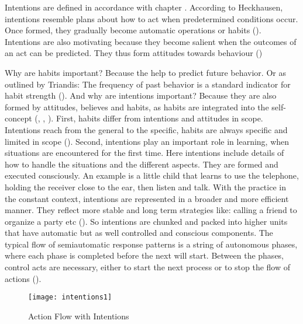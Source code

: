 Intentions are defined in accordance with chapter \label{knowledge and task}. According to Heckhausen, intentions resemble plans about how to act when predetermined conditions occur. Once formed, they gradually become automatic operations or habits (\cite{heckhausen1990intentional}). Intentions are also motivating because they become salient when the outcomes of an act can be predicted. They thus form attitudes towards behaviour (\cite{ouellette1998habit})

Why are habits important? Because the help to predict future behavior. Or as outlined by Triandis: The frequency of past behavior is a standard indicator for habit strength (\cite{triandis1979values}). And why are intentions important? Because they are also formed by attitudes, believes and habits, as habits are integrated into the self-concept (\cite{ouellette1998habit}, \cite{festinger1962theory}, \cite{bem1973self}). First, habits differ from intentions and attitudes in scope. Intentions reach from the general to the specific, habits are always specific and limited in scope (\cite{allport1935attitudes}). Second, intentions play an important role in learning, when situations are encountered for the first time. Here intentions include details of how to handle the situations and the different aspects. They are formed and executed consciously. An example is a little child that learns to use the telephone, holding the receiver close to the ear, then listen and talk. With the practice in the constant context, intentions are represented in a broader and more efficient manner. They reflect more stable and long term strategies like: calling a friend to organize a party etc (\cite{heckhausen1990intentional}). So intentions are chunked and packed into higher units that have automatic but as well controlled and conscious components. The typical flow of semiautomatic response patterns is a string of autonomous phases, where each phase is completed before the next will start. Between the phases, control acts are necessary, either to start the next process or to stop the flow of actions (\cite{bargh1989conditional}). 

\begin{figure}[ht]
	\centering
  \texttt{[image: intentions1]}
	\caption{Action Flow with Intentions}
	\label{fig5}
\end{figure}

